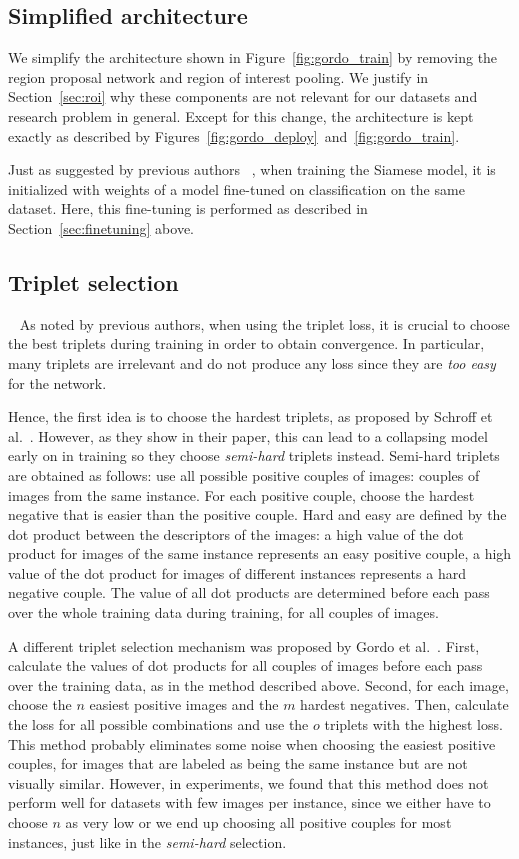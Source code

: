 \subsection{Simplified architecture}
We simplify the architecture shown in Figure~\ref{fig:gordo_train}
by removing the region proposal network and region of interest pooling.
We justify in Section~\ref{sec:roi} why these components are not
relevant for our datasets and research problem in general.
Except for this change, the architecture is kept exactly as described
by Figures~\ref{fig:gordo_deploy}~and~\ref{fig:gordo_train}.

Just as suggested by previous authors
~\cite{gordo_deep_2016,schroff_facenet:_2015}, when training the Siamese
model, it is initialized with weights of a model fine-tuned on classification
on the same dataset. Here, this fine-tuning is performed as described in
Section~\ref{sec:finetuning} above.

\subsection{Triplet selection}~\label{sec:tripletselection}
As noted by previous authors, when using the triplet loss, it is
crucial to choose the best triplets during training in order to
obtain convergence. In particular, many triplets are irrelevant
and do not produce any loss since they are \emph{too easy} for the network.

Hence, the first idea is to choose the hardest triplets, as proposed by
Schroff et al.~\cite{schroff_facenet:_2015}. However, as they show in
their paper, this can lead to a collapsing model early on in training
so they choose \emph{semi-hard} triplets instead. Semi-hard triplets
are obtained as follows:
use all possible positive couples of images: couples of images from the
same instance. For each positive couple, choose the hardest negative
that is easier than the positive couple. Hard and easy are defined
by the dot product between the descriptors of the images: a high value
of the dot product for images of the same instance represents an easy
positive couple, a high value of the dot product for images of different
instances represents a hard negative couple.
The value of all dot products are determined before each pass over
the whole training data during training, for all couples of images.

A different triplet selection mechanism was proposed by
Gordo et al.~\cite{gordo_end--end_2017}.
First, calculate the values of dot products for all couples of
images before each pass over the training data, as in the method described
above.
Second, for each image, choose the $n$ easiest positive images and the
$m$ hardest negatives. Then, calculate the loss for all possible combinations
and use the $o$ triplets with the highest loss.
This method probably eliminates some noise when choosing the easiest
positive couples, for images that are labeled as being the same instance
but are not visually similar.
However, in experiments, we found that this method does not perform well
for datasets with few images per instance, since we either have to
choose $n$ as very low or we end up choosing all positive couples for
most instances, just like in the \emph{semi-hard} selection.

